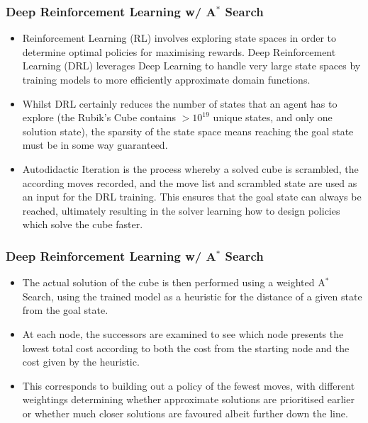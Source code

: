 \documentclass[UKenglish]{beamer}
\begin{document}
\begin{frame}
  \frametitle{Deep Reinforcement Learning w/ A$^\ast$ Search}
  \begin{itemize}
  \item Reinforcement Learning (RL) involves exploring state spaces in order to determine optimal policies for maximising rewards. Deep Reinforcement Learning (DRL) leverages Deep Learning to handle very large state spaces by training models to more efficiently approximate domain functions.
  \item Whilst DRL certainly reduces the number of states that an agent has to explore (the Rubik's Cube contains $ > 10^{19}$ unique states, and only one solution state), the sparsity of the state space means reaching the goal state must be in some way guaranteed.
  \item Autodidactic Iteration is the process whereby a solved cube is scrambled, the according moves recorded, and the move list and scrambled state are used as an input for the DRL training. This ensures that the goal state can always be reached, ultimately resulting in the solver learning how to design policies which solve the cube faster.
  \end{itemize}
\end{frame}

\begin{frame}
  \frametitle{Deep Reinforcement Learning w/ A$^\ast$ Search}
  \begin{itemize}
  \item The actual solution of the cube is then performed using a weighted A$^\ast$ Search, using the trained model as a heuristic for the distance of a given state from the goal state.
  \item At each node, the successors are examined to see which node presents the lowest total cost according to both the cost from the starting node and the cost given by the heuristic.
  \item This corresponds to building out a policy of the fewest moves, with different weightings determining whether approximate solutions are prioritised earlier or whether much closer solutions are favoured albeit further down the line.
  \end{itemize}
\end{frame}
\end{document}
